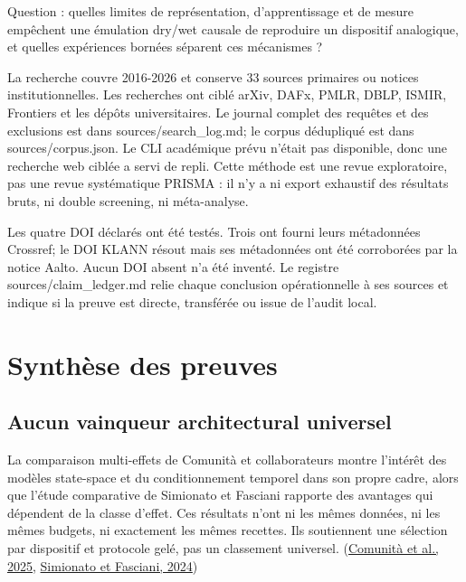 \documentclass[10pt,a4paper]{article}
\begin{document}
Question : quelles limites de repr\'{e}sentation, d'apprentissage et de mesure
emp\^{e}chent une \'{e}mulation dry/wet causale de reproduire un dispositif analogique,
et quelles exp\'{e}riences born\'{e}es s\'{e}parent ces m\'{e}canismes ?

La recherche couvre 2016-2026 et conserve 33 sources primaires ou notices
institutionnelles. Les recherches ont cibl\'{e} arXiv, DAFx, PMLR, DBLP, ISMIR,
Frontiers et les d\'{e}p\^{o}ts universitaires. Le journal complet des requ\^{e}tes et des
exclusions est dans sources/search\_log.md; le corpus d\'{e}dupliqu\'{e} est dans
sources/corpus.json. Le CLI acad\'{e}mique pr\'{e}vu n'\'{e}tait pas disponible, donc une
recherche web cibl\'{e}e a servi de repli. Cette m\'{e}thode est une revue exploratoire,
pas une revue syst\'{e}matique PRISMA : il n'y a ni export exhaustif des r\'{e}sultats
bruts, ni double screening, ni m\'{e}ta-analyse.

Les quatre DOI d\'{e}clar\'{e}s ont \'{e}t\'{e} test\'{e}s. Trois ont fourni leurs m\'{e}tadonn\'{e}es
Crossref; le DOI KLANN r\'{e}sout mais ses m\'{e}tadonn\'{e}es ont \'{e}t\'{e} corrobor\'{e}es par la
notice Aalto. Aucun DOI absent n'a \'{e}t\'{e} invent\'{e}. Le registre
sources/claim\_ledger.md relie chaque conclusion op\'{e}rationnelle \`{a} ses sources et
indique si la preuve est directe, transf\'{e}r\'{e}e ou issue de l'audit local.

\section{Synth\`{e}se des preuves}

\subsection{Aucun vainqueur architectural universel}

La comparaison multi-effets de Comunit\`{a} et collaborateurs montre l'int\'{e}r\^{e}t des
mod\`{e}les state-space et du conditionnement temporel dans son propre cadre, alors
que l'\'{e}tude comparative de Simionato et Fasciani rapporte des avantages qui
d\'{e}pendent de la classe d'effet. Ces r\'{e}sultats n'ont ni les m\^{e}mes donn\'{e}es, ni les
m\^{e}mes budgets, ni exactement les m\^{e}mes recettes. Ils soutiennent une s\'{e}lection
par dispositif et protocole gel\'{e}, pas un classement universel.
(\href{https://www.frontiersin.org/journals/signal-processing/articles/10.3389/frsip.2025.1580395/full}{Comunit\`{a} et al., 2025},
\href{https://arxiv.org/abs/2405.04124}{Simionato et Fasciani, 2024})
\end{document}
